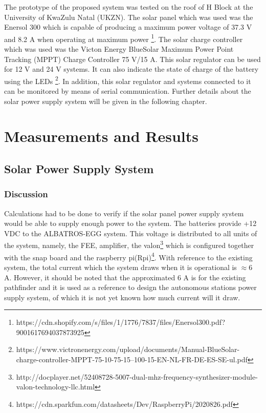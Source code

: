 \documentclass[12pt,a4paper]{report}
\begin{document}
	The prototype of the proposed system was tested on the roof of H Block at the University of KwaZulu Natal (UKZN). The solar panel which was used was the Enersol 300 which is capable of producing a maximum power voltage of 37.3 V and 8.2 A when operating at maximum power \footnote{https://cdn.shopify.com/s/files/1/1776/7837/files/Enersol300.pdf?9001617694037873925}. The solar charge controller which was used was the Victon Energy BlueSolar Maximum Power Point Tracking (MPPT) Charge Controller 75 V/15 A. This solar regulator can be used for 12 V and 24 V systems. It can also indicate the state of charge of the battery using the LEDs \footnote{https://www.victronenergy.com/upload/documents/Manual-BlueSolar-charge-controller-MPPT-75-10-75-15--100-15-EN-NL-FR-DE-ES-SE-ul.pdf}. In addition, this solar regulator and systems connected to it can be monitored by means of serial communication. Further details about the solar power supply system will be given	in the following chapter.
	
	
	
\newpage		
\chapter{Measurements and Results}

\section{Solar Power Supply System}
\subsection{Discussion}

Calculations had to be done to verify if the solar panel power supply system would be able to supply enough power to the system. The batteries provide +12 VDC to the ALBATROS-EGG system. This voltage is distributed to all units of the system, namely, the FEE, amplifier, the valon\footnote{http://docplayer.net/52408728-5007-dual-mhz-frequency-synthesizer-module-valon-technology-llc.html} which is configured together with the snap board and the raspberry pi(Rpi)\footnote{https://cdn.sparkfun.com/datasheets/Dev/RaspberryPi/2020826.pdf}. With reference to the existing system, the total current which the system draws when it is operational is $\approx$6 A. However, it should be noted that the approximated 6 A is for the existing pathfinder and it is used as a reference to design the autonomous stations power supply system, of which it is not yet known how much current will it draw.\\
\end{document}
